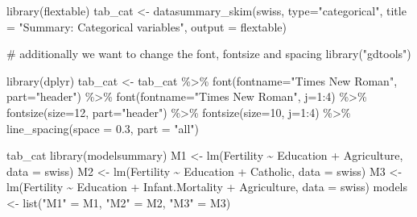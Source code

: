 \documentclass[
  letterpaper,
  DIV=11,
  numbers=noendperiod]{scrartcl}
\newenvironment{Shaded}{\begin{snugshade}}{\end{snugshade}}
\newcommand{\AttributeTok}[1]{\textcolor[rgb]{0.40,0.45,0.13}{#1}}
\newcommand{\CommentTok}[1]{\textcolor[rgb]{0.37,0.37,0.37}{#1}}
\newcommand{\DecValTok}[1]{\textcolor[rgb]{0.68,0.00,0.00}{#1}}
\newcommand{\FloatTok}[1]{\textcolor[rgb]{0.68,0.00,0.00}{#1}}
\newcommand{\FunctionTok}[1]{\textcolor[rgb]{0.28,0.35,0.67}{#1}}
\newcommand{\NormalTok}[1]{\textcolor[rgb]{0.00,0.23,0.31}{#1}}
\newcommand{\OtherTok}[1]{\textcolor[rgb]{0.00,0.23,0.31}{#1}}
\newcommand{\SpecialCharTok}[1]{\textcolor[rgb]{0.37,0.37,0.37}{#1}}
\newcommand{\StringTok}[1]{\textcolor[rgb]{0.13,0.47,0.30}{#1}}
\begin{document}
\begin{Shaded}
\begin{Highlighting}[]
\FunctionTok{library}\NormalTok{(flextable)}
\NormalTok{tab\_cat }\OtherTok{\textless{}{-}} \FunctionTok{datasummary\_skim}\NormalTok{(swiss, }
                            \AttributeTok{type=}\StringTok{"categorical"}\NormalTok{, }
                            \AttributeTok{title =} \StringTok{"Summary: Categorical variables"}\NormalTok{,}
                            \AttributeTok{output =} \StringTok{\textquotesingle{}flextable\textquotesingle{}}\NormalTok{)}

\CommentTok{\# additionally we want to change the font, fontsize and spacing}
\FunctionTok{library}\NormalTok{(}\StringTok{"gdtools"}\NormalTok{)}

\FunctionTok{library}\NormalTok{(dplyr)}
\NormalTok{tab\_cat }\OtherTok{\textless{}{-}}\NormalTok{ tab\_cat }\SpecialCharTok{\%\textgreater{}\%}
  \FunctionTok{font}\NormalTok{(}\AttributeTok{fontname=}\StringTok{"Times New Roman"}\NormalTok{, }\AttributeTok{part=}\StringTok{"header"}\NormalTok{) }\SpecialCharTok{\%\textgreater{}\%}
  \FunctionTok{font}\NormalTok{(}\AttributeTok{fontname=}\StringTok{"Times New Roman"}\NormalTok{, }\AttributeTok{j=}\DecValTok{1}\SpecialCharTok{:}\DecValTok{4}\NormalTok{) }\SpecialCharTok{\%\textgreater{}\%} 
  \FunctionTok{fontsize}\NormalTok{(}\AttributeTok{size=}\DecValTok{12}\NormalTok{, }\AttributeTok{part=}\StringTok{"header"}\NormalTok{) }\SpecialCharTok{\%\textgreater{}\%}
  \FunctionTok{fontsize}\NormalTok{(}\AttributeTok{size=}\DecValTok{10}\NormalTok{, }\AttributeTok{j=}\DecValTok{1}\SpecialCharTok{:}\DecValTok{4}\NormalTok{) }\SpecialCharTok{\%\textgreater{}\%} 
  \FunctionTok{line\_spacing}\NormalTok{(}\AttributeTok{space =} \FloatTok{0.3}\NormalTok{, }\AttributeTok{part =} \StringTok{"all"}\NormalTok{)}

\NormalTok{tab\_cat}
\FunctionTok{library}\NormalTok{(modelsummary)}
\NormalTok{M1 }\OtherTok{\textless{}{-}} \FunctionTok{lm}\NormalTok{(Fertility }\SpecialCharTok{\textasciitilde{}}\NormalTok{ Education }\SpecialCharTok{+}\NormalTok{ Agriculture, }\AttributeTok{data =}\NormalTok{ swiss)}
\NormalTok{M2 }\OtherTok{\textless{}{-}} \FunctionTok{lm}\NormalTok{(Fertility }\SpecialCharTok{\textasciitilde{}}\NormalTok{ Education }\SpecialCharTok{+}\NormalTok{ Catholic, }\AttributeTok{data =}\NormalTok{ swiss)}
\NormalTok{M3 }\OtherTok{\textless{}{-}} \FunctionTok{lm}\NormalTok{(Fertility }\SpecialCharTok{\textasciitilde{}}\NormalTok{ Education }\SpecialCharTok{+}\NormalTok{ Infant.Mortality }\SpecialCharTok{+}\NormalTok{ Agriculture, }\AttributeTok{data =}\NormalTok{ swiss)}
\NormalTok{models }\OtherTok{\textless{}{-}} \FunctionTok{list}\NormalTok{(}\StringTok{"M1"} \OtherTok{=}\NormalTok{ M1, }\StringTok{"M2"} \OtherTok{=}\NormalTok{  M2, }\StringTok{"M3"} \OtherTok{=}\NormalTok{ M3)}



\end{Highlighting}
\end{Shaded}
\end{document}
